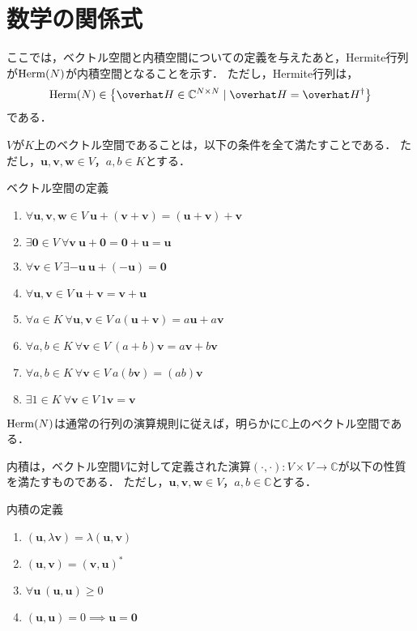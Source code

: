 \documentclass{report}
\begin{document}
  \chapter{数学の関係式}\label{pauli-matrix}
    ここでは，ベクトル空間と内積空間についての定義を与えたあと，Hermite行列が$\mathrm{Herm}(N)$が内積空間となることを示す．
    ただし，Hermite行列は，
    \begin{align}
      \r{Herm}(N) \in \qty{\hat{H} \in \mathbb{C}^{N\times N} \mid \hat{H} = \hat{H}^{\dag}}
    \end{align}
    である．
    \par
    $V$が$K$上のベクトル空間であることは，以下の条件を全て満たすことである．
    ただし，$\bm{u}, \bm{v}, \bm{w} \in V$，$a, b \in K$とする．
    \begin{itembox}[l]{ベクトル空間の定義}
      \begin{enumerate}
        \item $\forall \bm{u}, \bm{v}, \bm{w} \in V\ \bm{u} + (\bm{v} + \bm{v}) = (\bm{u} + \bm{v}) + \bm{v}$
        \item $\exists \bm{0} \in V\ \forall \bm{v}\ \bm{u} + \bm{0} = \bm{0} + \bm{u} = \bm{u} $
        \item $\forall \bm{v} \in V\ \exists -\bm{u}\ \bm{u} + (-\bm{u}) = \bm{0}$
        \item $\forall \bm{u}, \bm{v} \in V\ \bm{u} + \bm{v} = \bm{v} + \bm{u}$
        \item $\forall a \in K\ \forall \bm{u}, \bm{v} \in V\ a(\bm{u} + \bm{v}) = a\bm{u} + a\bm{v}$
        \item $\forall a, b \in K\ \forall \bm{v} \in V\ (a + b)\bm{v} = a\bm{v} + b\bm{v}$
        \item $\forall a, b \in K\ \forall \bm{v} \in V\ a(b\bm{v}) = (ab)\bm{v}$
        \item $\exists 1 \in K\ \forall \bm{v} \in V\ 1\bm{v} = \bm{v}$
      \end{enumerate}
    \end{itembox}
    $\mathrm{Herm}(N)$は通常の行列の演算規則に従えば，明らかに$\mathbb{C}$上のベクトル空間である．
    \par
    内積は，ベクトル空間$V$に対して定義された演算$(\cdot, \cdot): V\times V \to \mathbb{C}$が以下の性質を満たすものである．
    ただし，$\bm{u}, \bm{v}, \bm{w} \in V$，$a, b \in \mathbb{C}$とする．
    \begin{itembox}[l]{内積の定義}
      \begin{enumerate}
        \item $(\bm{u}, \lambda \bm{v}) = \lambda (\bm{u}, \bm{v})$
        \item $(\bm{u}, \bm{v}) = (\bm{v}, \bm{u})^*$
        \item $\forall \bm{u}\ (\bm{u}, \bm{u}) \geq 0$
        \item $(\bm{u}, \bm{u}) = 0 \implies \bm{u} = \bm{0}$
      \end{enumerate}
    \end{itembox}
\end{document}
